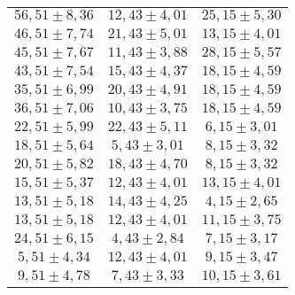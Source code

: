 \begin{table}[H]
\begin{tabular}{c c c}
      $56,51 \pm 8,36$ & $12,43 \pm 4,01$ & $25,15 \pm 5,30$ \\
      $46,51 \pm 7,74$ & $21,43 \pm 5,01$ & $13,15 \pm 4,01$ \\
      $45,51 \pm 7,67$ & $11,43 \pm 3,88$ & $28,15 \pm 5,57$ \\
      $43,51 \pm 7,54$ & $15,43 \pm 4,37$ & $18,15 \pm 4,59$ \\
      $35,51 \pm 6,99$ & $20,43 \pm 4,91$ & $18,15 \pm 4,59$ \\
      $36,51 \pm 7,06$ & $10,43 \pm 3,75$ & $18,15 \pm 4,59$ \\
      $22,51 \pm 5,99$ & $22,43 \pm 5,11$ & $6,15 \pm 3,01$ \\
      $18,51 \pm 5,64$ & $5,43 \pm 3,01$ & $8,15 \pm 3,32$ \\
      $20,51 \pm 5,82$ & $18,43 \pm 4,70$ & $8,15 \pm 3,32$ \\
      $15,51 \pm 5,37$ & $12,43 \pm 4,01$ & $13,15 \pm 4,01$ \\
      $13,51 \pm 5,18$ & $14,43 \pm 4,25$ & $4,15 \pm 2,65$ \\
      $13,51 \pm 5,18$ & $12,43 \pm 4,01$ & $11,15 \pm 3,75$ \\
      $24,51 \pm 6,15$ & $4,43 \pm 2,84$ & $7,15 \pm 3,17$ \\
      $5,51 \pm 4,34$ & $12,43 \pm 4,01$ & $9,15 \pm 3,47$ \\
      $9,51 \pm 4,78$ & $7,43 \pm 3,33$ & $10,15 \pm 3,61$ \\
      \bottomrule
  \end{tabular}
\end{table}
